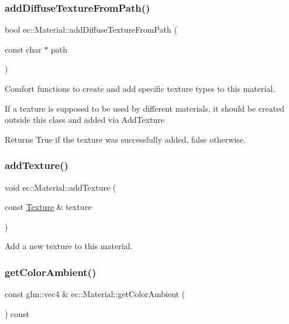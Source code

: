 \subsubsection{\texorpdfstring{add\+Diffuse\+Texture\+From\+Path()}{addDiffuseTextureFromPath()}}
{\footnotesize\ttfamily bool ec\+::\+Material\+::add\+Diffuse\+Texture\+From\+Path (\begin{DoxyParamCaption}\item[{const char $\ast$}]{path }\end{DoxyParamCaption})}



Comfort functions to create and add specific texture types to this material. 

If a texture is supposed to be used by different materials, it should be created outside this class and added via Add\+Texture \begin{DoxyReturn}{Returns}
True if the texture was successfully added, false otherwise. 
\end{DoxyReturn}
\mbox{\label{classec_1_1_material_aad92ada3fcc1f7b66e6bf3b6aeac73b8}} 
\subsubsection{\texorpdfstring{add\+Texture()}{addTexture()}}
{\footnotesize\ttfamily void ec\+::\+Material\+::add\+Texture (\begin{DoxyParamCaption}\item[{const \mbox{\hyperlink{classec_1_1_texture}{Texture}} \&}]{texture }\end{DoxyParamCaption})}



Add a new texture to this material. 

\mbox{\label{classec_1_1_material_a68e143f6390ae7e9bc6c080853191f94}} 
\subsubsection{\texorpdfstring{get\+Color\+Ambient()}{getColorAmbient()}}
{\footnotesize\ttfamily const glm\+::vec4 \& ec\+::\+Material\+::get\+Color\+Ambient (\begin{DoxyParamCaption}{ }\end{DoxyParamCaption}) const}



